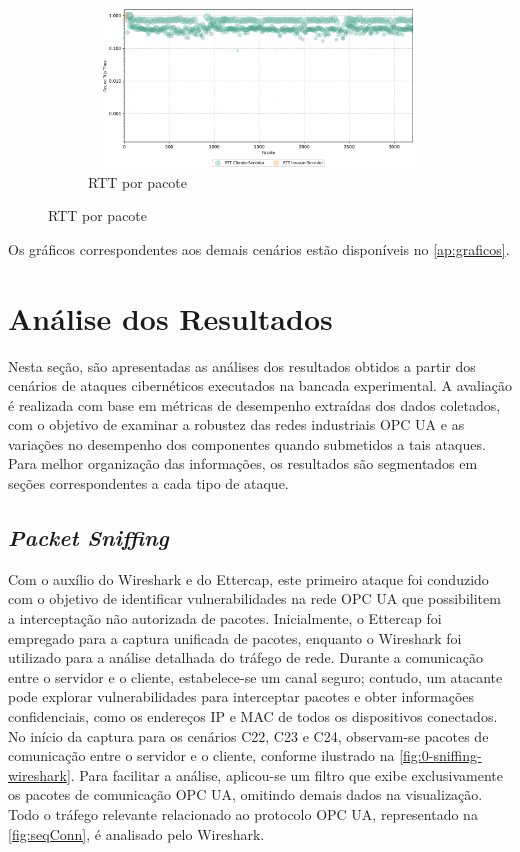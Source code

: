 \begin{figure}[htbp!]
\begin{subfigure}[t]{0.5\textwidth}
            \centering
            \caption{RTT por pacote}
            \includegraphics[width=1\textwidth, height=120pt]{USPSC-img/output/cropped/0-normal_local_server-rttp.png}
        \end{subfigure}%
    \end{figure}

    Os gráficos correspondentes aos demais cenários estão disponíveis no \autoref{ap:graficos}.

\section{Análise dos Resultados} \label{sec:analise-resultados}

    Nesta seção, são apresentadas as análises dos resultados obtidos a partir dos cenários de ataques cibernéticos executados na bancada experimental. A avaliação é realizada com base em métricas de desempenho extraídas dos dados coletados, com o objetivo de examinar a robustez das redes industriais OPC UA e as variações no desempenho dos componentes quando submetidos a tais ataques. Para melhor organização das informações, os resultados são segmentados em seções correspondentes a cada tipo de ataque.

    \subsection{\textit{Packet Sniffing}}

        Com o auxílio do Wireshark e do Ettercap, este primeiro ataque foi conduzido com o objetivo de identificar vulnerabilidades na rede OPC UA que possibilitem a interceptação não autorizada de pacotes. Inicialmente, o Ettercap foi empregado para a captura unificada de pacotes, enquanto o Wireshark foi utilizado para a análise detalhada do tráfego de rede. Durante a comunicação entre o servidor e o cliente, estabelece-se um canal seguro; contudo, um atacante pode explorar vulnerabilidades para interceptar pacotes e obter informações confidenciais, como os endereços IP e MAC de todos os dispositivos conectados. No início da captura para os cenários C22, C23 e C24, observam-se pacotes de comunicação entre o servidor e o cliente, conforme ilustrado na \autoref{fig:0-sniffing-wireshark}. Para facilitar a análise, aplicou-se um filtro que exibe exclusivamente os pacotes de comunicação OPC UA, omitindo demais dados na visualização. Todo o tráfego relevante relacionado ao protocolo OPC UA, representado na \autoref{fig:seqConn}, é analisado pelo Wireshark.

